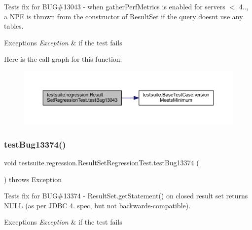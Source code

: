 Tests fix for B\+UG\#13043 -\/ when \textquotesingle{}gather\+Perf\+Metrics\textquotesingle{} is enabled for servers $<$ 4.., a N\+PE is thrown from the constructor of Result\+Set if the query doesn\textquotesingle{}t use any tables.


\begin{DoxyExceptions}{Exceptions}
{\em Exception} & if the test fails \\
\hline
\end{DoxyExceptions}
Here is the call graph for this function\+:
\nopagebreak
\begin{figure}[H]
\begin{center}
\leavevmode
\includegraphics[width=350pt]{classtestsuite_1_1regression_1_1_result_set_regression_test_a06717a5b3c5be030d27a05516d1d2193_cgraph}
\end{center}
\end{figure}
\mbox{\label{classtestsuite_1_1regression_1_1_result_set_regression_test_abdbc02c21cba6186722920df8fe7dd63}} 
\subsubsection{\texorpdfstring{test\+Bug13374()}{testBug13374()}}
{\footnotesize\ttfamily void testsuite.\+regression.\+Result\+Set\+Regression\+Test.\+test\+Bug13374 (\begin{DoxyParamCaption}{ }\end{DoxyParamCaption}) throws Exception}

Tests fix for B\+UG\#13374 -\/ Result\+Set.\+get\+Statement() on closed result set returns N\+U\+LL (as per J\+D\+BC 4. spec, but not backwards-\/compatible).


\begin{DoxyExceptions}{Exceptions}
{\em Exception} & if the test fails \\
\hline
\end{DoxyExceptions}
\mbox{\label{classtestsuite_1_1regression_1_1_result_set_regression_test_ac1d2232b96f37d2f6ce4fbf52264cff8}} 
